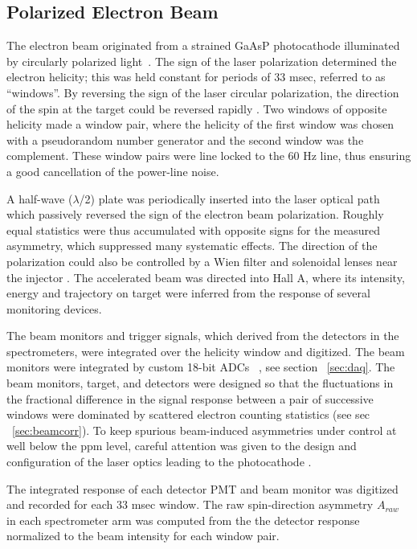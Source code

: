 
\subsection{Polarized Electron Beam}\label{sec:app_electronbeam}

The electron beam originated from a strained GaAsP 
photocathode illuminated by 
circularly polarized light~\cite{Sinclair2007}.
The sign of the laser polarization determined the electron
helicity; this was held constant for periods of 33 msec,
referred to as ``windows''.
By reversing the sign of the laser circular 
polarization, the direction of the spin at the target could be 
reversed rapidly \cite{Paschke:2007zz}.
Two windows of opposite helicity made a window pair, where
the helicity of the first window was chosen with a pseudorandom
number generator and the second window was the complement.
These window pairs were line locked to the 60 Hz line,
thus ensuring a good cancellation of the power-line noise. 
 
A half-wave ($\lambda$/2) plate was periodically inserted into the 
laser optical path which passively reversed the
sign of the electron beam polarization. 
Roughly equal statistics were thus 
accumulated with opposite signs for the measured asymmetry, 
which suppressed many systematic effects.  
The direction of the polarization could also be
controlled by a Wien filter and solenoidal lenses
near the injector \cite{GramesWien2011}.  The accelerated beam was 
directed into Hall A, where its intensity, energy and trajectory on 
target were inferred from the response of several monitoring devices.

The beam monitors and trigger signals, which derived from
the detectors in the spectrometers, 
were integrated over the helicity window
and digitized.  The beam monitors were integrated by
custom 18-bit ADCs ~\cite{prex}, see section ~\ref{sec:daq}.
The beam monitors, target, and detectors were designed so that
the fluctuations in the fractional difference in 
the signal response between
a pair of successive windows were
dominated by scattered electron counting 
statistics (see sec ~\ref{sec:beamcorr}).
To keep spurious beam-induced asymmetries under
control at well below the ppm level, 
careful attention was given to the design and configuration of the laser 
optics leading to the photocathode \cite{Paschke:2007zz}.

The integrated response of each detector PMT and beam monitor
was digitized and recorded for each 33 msec window.
The raw spin-direction asymmetry $A_{raw}$
in each spectrometer arm was computed from the the detector response
normalized to the beam intensity 
for each window pair. 


